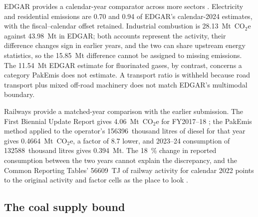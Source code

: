 \documentclass[essd,manuscript]{copernicus}
\begin{document}


EDGAR provides a calendar-year comparator across more sectors \citep{EDGAR2025}. Electricity and residential emissions are \num{0.70} and \num{0.94} of EDGAR's calendar-2024 estimates, with the fiscal--calendar offset retained. Industrial combustion is \SI{28.13}{\mega\tonne}~CO$_2$e against \SI{43.98}{\mega\tonne} in EDGAR; both accounts represent the activity, their difference changes sign in earlier years, and the two can share upstream energy statistics, so the \SI{15.85}{\mega\tonne} difference cannot be assigned to missing emissions. The \SI{11.54}{\mega\tonne} EDGAR estimate for fluorinated gases, by contrast, concerns a category PakEmis does not estimate. A transport ratio is withheld because road transport plus mixed off-road machinery does not match EDGAR's multimodal boundary.

Railways provide a matched-year comparison with the earlier submission. The First Biennial Update Report gives \SI{4.06}{\mega\tonne}~CO$_2$e for FY2017--18 \citep{PakistanBUR2022}; the PakEmis method applied to the operator's \num{156396}~thousand litres of diesel for that year gives \SI{0.4664}{\mega\tonne}~CO$_2$e, a factor of \num{8.7} lower, and 2023--24 consumption of \num{132588}~thousand litres gives \SI{0.394}{\mega\tonne}. The \SI{18}{\percent} change in reported consumption between the two years cannot explain the discrepancy, and the Common Reporting Tables' \SI{56609}{\tera\joule} of railway activity for calendar 2022 points to the original activity and factor cells as the place to look \citep{PakistanCRT2026}.

\subsection{The coal supply bound}
\label{sec:coal}
\end{document}

